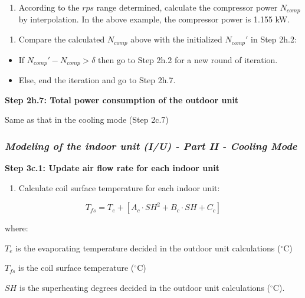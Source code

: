 \begin{enumerate}
\def\labelenumi{\alph{enumi}.}
\setcounter{enumi}{1}
\tightlist
\item
  According to the \(rps\) range determined, calculate the compressor power \(N_{comp}\) by interpolation. In the above example, the compressor power is 1.155 kW.
\end{enumerate}

\begin{enumerate}
\def\labelenumi{(\arabic{enumi})}
\setcounter{enumi}{1}
\tightlist
\item
  Compare the calculated \(N_{comp}\) above with the initialized \({N_{comp}}'\) in Step 2h.2:
\end{enumerate}

\begin{itemize}
\item
  If \({N_{comp}}'-N_{comp}>\delta\) then go to Step 2h.2 for a new round of iteration.
\item
  Else, end the iteration and go to Step 2h.7.
\end{itemize}

\textbf{Step 2h.7: Total power consumption of the outdoor unit}

Same as that in the cooling mode (Step 2c.7)

\subsubsection{\emph{Modeling of the indoor unit (I/U) - Part II - Cooling Mode}}\label{modeling-of-the-indoor-unit-iu---part-ii---cooling-mode}

\textbf{Step 3c.1: Update air flow rate for each indoor unit}

\begin{enumerate}
\def\labelenumi{(\arabic{enumi})}
\tightlist
\item
  Calculate coil surface temperature for each indoor unit:
\end{enumerate}

\begin{equation}
T_{fs} = T_e+[A_c\cdot SH^2+B_c\cdot SH+C_c]
\end{equation}

where:

\(T_e\) is the evaporating temperature decided in the outdoor unit calculations (\(^{\circ}\)C)

\(T_{fs}\) is the coil surface temperature (\(^{\circ}\)C)

\(SH\) is the superheating degrees decided in the outdoor unit calculations (\(^{\circ}\)C).

